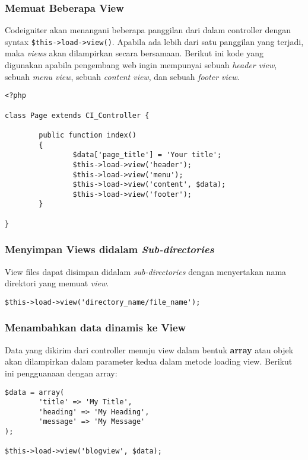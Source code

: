 \subsubsection{Memuat Beberapa View}
\label{sssec:view_2}
Codeigniter akan menangani beberapa panggilan dari dalam controller dengan syntax \verb|$this->load->view()|. Apabila ada lebih dari satu panggilan yang terjadi, maka \textit{views} akan dilampirkan secara bersamaan. Berikut ini kode yang digunakan apabila pengembang web ingin mempunyai sebuah \textit{header view}, sebuah \textit{menu view}, sebuah \textit{content view}, dan sebuah \textit{footer view}. \cite{codeigniter:17}
\begin{lstlisting}[frame=single] 
<?php

class Page extends CI_Controller {

        public function index()
        {
                $data['page_title'] = 'Your title';
                $this->load->view('header');
                $this->load->view('menu');
                $this->load->view('content', $data);
                $this->load->view('footer');
        }

}
\end{lstlisting}

\subsubsection{Menyimpan Views didalam \textit{Sub-directories}}
\label{sssec:view_3}
View files dapat disimpan didalam \textit{sub-directories} dengan menyertakan nama direktori yang memuat \textit{view}.
\begin{lstlisting}[frame=single] 
$this->load->view('directory_name/file_name');
\end{lstlisting}

\subsubsection{Menambahkan data dinamis ke View}
\label{sssec:view_4}
Data yang dikirim dari controller menuju view dalam bentuk \textbf{array} atau objek akan dilampirkan dalam parameter kedua dalam metode loading view. \cite{codeigniter:17}
Berikut ini pengguanaan dengan array:
\begin{lstlisting}[frame=single] 
$data = array(
        'title' => 'My Title',
        'heading' => 'My Heading',
        'message' => 'My Message'
);

$this->load->view('blogview', $data);
\end{lstlisting}


